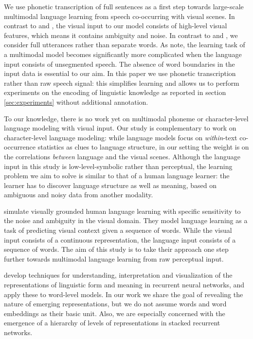 We use phonetic transcription of full sentences as a first step
towards large-scale multimodal language learning from speech
co-occurring with visual scenes. In contrast to 
and , the visual input to our model consists
of high-level visual features, which means it contains ambiguity and
noise. In contrast to  and
, we consider full utterances rather than
separate words. As  note, the learning task
of a multimodal model becomes significantly more complicated when the
language input consists of unsegmented speech. The absence of word
boundaries in the input data is essential to our aim. In this paper we use phonetic
transcription rather than raw speech signal: this simplifies learning
and allows us to perform experiments on the encoding of linguistic
knowledge as reported in section \ref{sec:experiments} without
additional annotation. 

To our knowledge, there is no work yet on multimodal phoneme or character-level language modeling with visual input. %
Our study is complementary to work on character-level language modeling: while language models focus on {\it within}-text co-occurrence statistics as clues to language structure, in our setting the weight is on the correlations  {\it between} language and the visual scenes. 
Although the language input in this study is low-level-symbolic rather than perceptual, the learning problem we aim to solve is similar to that of a human language learner: the learner has to discover language structure as well as meaning, based on ambiguous and noisy data from another modality. 

 simulate visually grounded human language learning with specific sensitivity to the noise and ambiguity in the visual domain. They model language learning as a task of predicting visual context given a sequence of words. While the visual input consists of a continuous representation, the language input consists of a sequence of words. The aim of this study is to take their approach one step further towards multimodal language learning from raw perceptual input. 

 develop techniques for understanding, interpretation and visualization of the representations of linguistic form and meaning in recurrent neural networks, and apply these to word-level models. In our work we share the goal of revealing the nature of emerging representations, but we do not assume words and word embeddings as their basic unit. Also, we are especially concerned with the emergence of a hierarchy of levels of representations in stacked recurrent networks.
